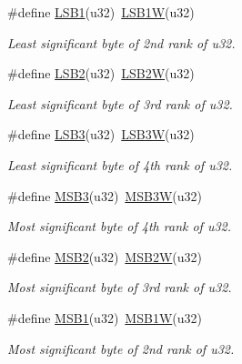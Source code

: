 \begin{DoxyCompactItemize}
\#define \mbox{\hyperlink{group__group__sam0__utils_ga2d1e45154b07481f0579ecc725e4edff}{L\+S\+B1}}(u32)~\mbox{\hyperlink{group__group__sam0__utils_ga84cbbcad1971cdb2987418e6ae6cb4ff}{L\+S\+B1W}}(u32)
\begin{DoxyCompactList}\small\item\em Least significant byte of 2nd rank of {\itshape u32}. \end{DoxyCompactList}\item 
\#define \mbox{\hyperlink{group__group__sam0__utils_ga8967f5ae0174b01ce44c502ebd14035a}{L\+S\+B2}}(u32)~\mbox{\hyperlink{group__group__sam0__utils_gad8fda97f8caa00fcfa84f712ee7627d6}{L\+S\+B2W}}(u32)
\begin{DoxyCompactList}\small\item\em Least significant byte of 3rd rank of {\itshape u32}. \end{DoxyCompactList}\item 
\#define \mbox{\hyperlink{group__group__sam0__utils_ga5d9ff393e7c8764112a1167db19b16b1}{L\+S\+B3}}(u32)~\mbox{\hyperlink{group__group__sam0__utils_ga04e75e548b33b9cc22699b4249ff6c64}{L\+S\+B3W}}(u32)
\begin{DoxyCompactList}\small\item\em Least significant byte of 4th rank of {\itshape u32}. \end{DoxyCompactList}\item 
\#define \mbox{\hyperlink{group__group__sam0__utils_gaeeb8918fc580ce01d45f71863eebff90}{M\+S\+B3}}(u32)~\mbox{\hyperlink{group__group__sam0__utils_gad6ab5ac6e3e95525d56d757c9718e352}{M\+S\+B3W}}(u32)
\begin{DoxyCompactList}\small\item\em Most significant byte of 4th rank of {\itshape u32}. \end{DoxyCompactList}\item 
\#define \mbox{\hyperlink{group__group__sam0__utils_ga8683254be29bcfe3cf2fa646890d3942}{M\+S\+B2}}(u32)~\mbox{\hyperlink{group__group__sam0__utils_ga0207e10a3c4bcca172463cd5e3ebd865}{M\+S\+B2W}}(u32)
\begin{DoxyCompactList}\small\item\em Most significant byte of 3rd rank of {\itshape u32}. \end{DoxyCompactList}\item 
\#define \mbox{\hyperlink{group__group__sam0__utils_ga3facab9f8ebf70ad6e16038465e2bedc}{M\+S\+B1}}(u32)~\mbox{\hyperlink{group__group__sam0__utils_ga0f90ecd0b0f0e15608a95b8367b77ece}{M\+S\+B1W}}(u32)
\begin{DoxyCompactList}\small\item\em Most significant byte of 2nd rank of {\itshape u32}. \end{DoxyCompactList}\item 

\end{DoxyCompactItemize}
